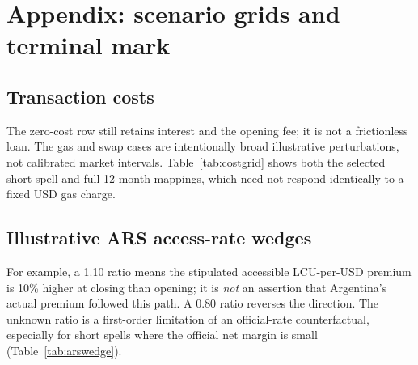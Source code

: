 \documentclass[sn-vancouver,Numbered]{sn-jnl}
\begin{document}
\section*{Appendix: scenario grids and terminal mark}
\subsection*{Transaction costs}
\begin{table}[htbp]
\caption{Illustrative gas and conversion-cost combinations at the 20\% effective annual rate and 0.5\% upfront fee. Selected clean-spell rows use official daily FX; full draw rows impose 12 months at monthly FX. Swap is the percentage charged \emph{each way}. Median and positive are percentages; the full 4-by-3 grid for each sample and currency is in the generated CSV.}
\label{tab:costgrid}\centering\small

\end{table}
The zero-cost row still retains interest and the opening fee; it is not a frictionless loan. The gas and swap cases are intentionally broad illustrative perturbations, not calibrated market intervals. Table~\ref{tab:costgrid} shows both the selected short-spell and full 12-month mappings, which need not respond identically to a fixed USD gas charge.

\subsection*{Illustrative ARS access-rate wedges}
\begin{table}[htbp]
\caption{A hypothetical ratio $w_h/w_0$ of the exit to entry ARS accessible-rate wedge relative to the BCRA reference. 1.00 reproduces the official-mark scenario; other rows alter the exit conversion factor algebraically without observing any executable or parallel-market price. Net median and positive share are percentages.}
\label{tab:arswedge}\centering\small

\end{table}
For example, a 1.10 ratio means the stipulated accessible LCU-per-USD premium is 10\% higher at closing than opening; it is \emph{not} an assertion that Argentina's actual premium followed this path. A 0.80 ratio reverses the direction. The unknown ratio is a first-order limitation of an official-rate counterfactual, especially for short spells where the official net margin is small (Table~\ref{tab:arswedge}).
\end{document}
